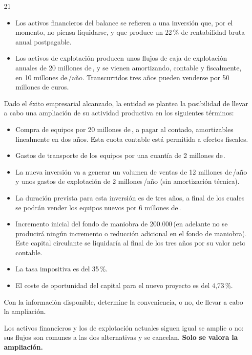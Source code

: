 \documentclass[10pt,a4paper,twoside]{article}
\newcommand{\eur}{\,\text{€}\xspace}
\begin{document}
\begin{enunciado}{21}
\begin{itemize}
  \item Los activos financieros del balance se refieren a una inversión que, por el momento, no piensa liquidarse, y que
        produce un 22\,\% de rentabilidad bruta anual postpagable.
  \item Los activos de explotación producen unos flujos de caja de explotación anuales de 20 millones de\eur, y se vienen
        amortizando, contable y fiscalmente, en 10 millones de\eur/año. Transcurridos tres años pueden venderse por 50
        millones de euros.
\end{itemize}
Dado el éxito empresarial alcanzado, la entidad se plantea la posibilidad de llevar a cabo una ampliación de su
actividad productiva en los siguientes términos:
\begin{itemize}
  \item Compra de equipos por 20 millones de\eur, a pagar al contado, amortizables linealmente en dos años. Esta cuota
        contable está permitida a efectos fiscales.
  \item Gastos de transporte de los equipos por una cuantía de 2 millones de\eur.
  \item La nueva inversión va a generar un volumen de ventas de 12 millones de\eur/año y unos gastos de explotación de 2
        millones\eur/año (sin amortización técnica).
  \item La duración prevista para esta inversión es de tres años, a final de los cuales se podrán vender los equipos
        nuevos por 6 millones de\eur.
  \item Incremento inicial del fondo de maniobra de 200.000\eur (en adelante no se producirá ningún incremento o reducción
        adicional en el fondo de maniobra). Este capital circulante se liquidaría al final de los tres años por su valor
        neto contable.
  \item La tasa impositiva es del 35\,\%.
  \item El coste de oportunidad del capital para el nuevo proyecto es del 4,73\,\%.
\end{itemize}
Con la información disponible, determine la conveniencia, o no, de llevar a cabo la ampliación.
\end{enunciado}

\begin{clave}
Los activos financieros y los de explotación actuales siguen igual se amplíe o no: sus flujos son comunes a las dos
alternativas y se cancelan. \textbf{Solo se valora la ampliación.}
\end{clave}
\end{document}
